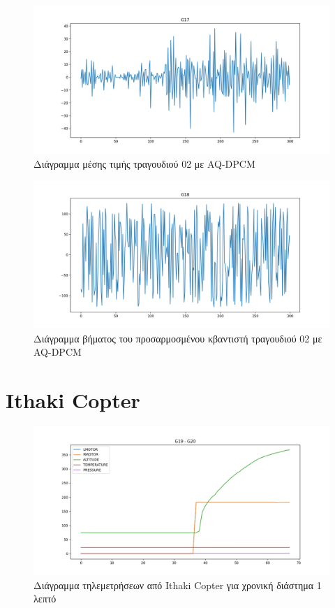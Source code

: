 \documentclass{article}
\begin{document}
\begin{figure}[H]
  \begin{center}
    \includegraphics[width=\textwidth]{G17.png}
  \end{center}
  \caption{Διάγραμμα μέσης τιμής τραγουδιού 02 με AQ-DPCM}
\end{figure}

\begin{figure}[H]
  \begin{center}
    \includegraphics[width=\textwidth]{G18.png}
  \end{center}
  \caption{Διάγραμμα βήματος του προσαρμοσμένου κβαντιστή τραγουδιού 02 με AQ-DPCM}
\end{figure}

\newpage

\section{Ithaki Copter}

\begin{figure}[H]
  \begin{center}
    \includegraphics[width=\textwidth]{G19-G20.png}
  \end{center}
  \caption{Διάγραμμα τηλεμετρήσεων από Ithaki Copter για χρονική διάστημα 1 λεπτό}
\end{figure}
\end{document}
